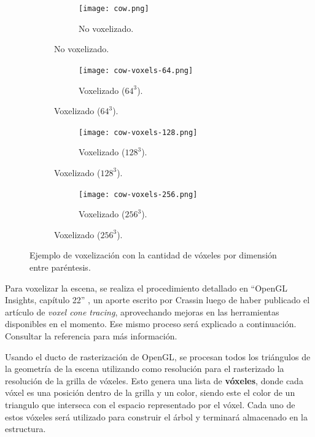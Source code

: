 \begin{figure}[ht]
    \begin{subfigure}{.50\textwidth}
        \centering
        \begin{subfigure}{.60\textwidth}
            \centering
            \texttt{[image: cow.png]}
            \caption{No voxelizado.}
        \end{subfigure}
    \end{subfigure}
    \begin{subfigure}{.50\textwidth}
        \centering
        \begin{subfigure}{.60\textwidth}
            \centering
            \texttt{[image: cow-voxels-64.png]}
            \caption{Voxelizado ($64^3$).}
        \end{subfigure}
    \end{subfigure}
    \begin{subfigure}{.50\textwidth}
        \centering
        \begin{subfigure}{.60\textwidth}
            \centering
            \texttt{[image: cow-voxels-128.png]}
            \caption{Voxelizado ($128^3$).}
        \end{subfigure}
    \end{subfigure}
    \begin{subfigure}{.50\textwidth}
        \centering
        \begin{subfigure}{.60\textwidth}
            \centering
            \texttt{[image: cow-voxels-256.png]}
            \caption{Voxelizado ($256^3$).}
        \end{subfigure}
    \end{subfigure}
    \caption{Ejemplo de voxelización con la cantidad de vóxeles por dimensión entre paréntesis.}
    \label{fig:voxelized-cow}
\end{figure}

Para voxelizar la escena, se realiza el procedimiento detallado en ``OpenGL Insights, capítulo 22'' \cite{opengl-insights}, un aporte escrito por Crassin luego de haber publicado el artículo de \textit{voxel cone tracing}, aprovechando mejoras en las herramientas disponibles en el momento.
Ese mismo proceso será explicado a continuación.
Consultar la referencia para más información.

Usando el ducto de rasterización de OpenGL, se procesan todos los triángulos de la geometría de la escena utilizando como resolución para el rasterizado la resolución de la grilla de vóxeles.
Esto genera una lista de \textbf{vóxeles}, donde cada vóxel es una posición dentro de la grilla y un color, siendo este el color de un triangulo que interseca con el espacio representado por el vóxel.
Cada uno de estos vóxeles será utilizado para construir el árbol y terminará almacenado en la estructura.

